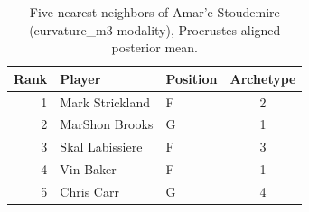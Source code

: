 \begin{table}[htbp]
  \centering\small
  \begin{tabular}{rllc}
    \toprule
    Rank & Player & Position & Archetype \\
    \midrule
    1 & Mark Strickland & F & 2 \\
    2 & MarShon Brooks & G & 1 \\
    3 & Skal Labissiere & F & 3 \\
    4 & Vin Baker & F & 1 \\
    5 & Chris Carr & G & 4 \\
    \bottomrule
  \end{tabular}
  \caption{Five nearest neighbors of Amar'e Stoudemire (curvature_m3 modality), Procrustes-aligned posterior mean.}
  \label{tab:Amar_e_Stoudemire_neighbors_curvature_m3}
\end{table}

